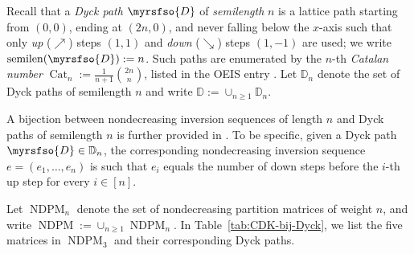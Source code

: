 \documentclass[12pt,reqno]{amsart}
\numberwithin{equation}{section}
\theoremstyle{theorem}
\theoremstyle{definition}
\theoremstyle{named}
\newcommand{\OEIS}[1]{\href{https://oeis.org/#1}{#1}}
\newcommand{\NDPM}{\operatorname{NDPM}}
\newcommand{\semilen}{\operatorname{semilen}}
\newcommand{\cD}{\myrsfso{D}}
\newcommand{\bbD}{\mathbb{D}}
\begin{document}
Recall that a \emph{Dyck path} $\cD$ of \emph{semilength} $n$ is a lattice path starting from $(0,0)$, ending at $(2n,0)$, and never falling below the $x$-axis such that only \emph{up} ($\nearrow$) steps $(1,1)$ and \emph{down} ($\searrow$) steps $(1,-1)$ are used; we write $\semilen(\cD) := n$. Such paths are enumerated by the $n$-th \emph{Catalan number} $\operatorname{Cat}_n := \frac{1}{n+1} \binom{2n}{n}$, listed in the OEIS entry \cite[\OEIS{A000108}]{OEIS}. Let $\bbD_n$ denote the set of Dyck paths of semilength $n$ and write $\bbD := \cup_{n\ge 1} \bbD_n$.

A bijection between nondecreasing inversion sequences of length $n$ and Dyck paths of semilength $n$ is further provided in \cite[p.~1628, Proposition~9]{CDK2011}. To be specific, given a Dyck path $\cD\in \bbD_n$, the corresponding nondecreasing inversion sequence $e=(e_1,\ldots,e_n)$ is such that $e_i$ equals the number of down steps before the $i$-th up step for every $i\in [n]$.

Let $\NDPM_n$ denote the set of nondecreasing partition matrices of weight $n$, and write $\NDPM := \cup_{n\ge 1} \NDPM_n$. In Table~\ref{tab:CDK-bij-Dyck}, we list the five matrices in $\NDPM_3$ and their corresponding Dyck paths.
\end{document}
